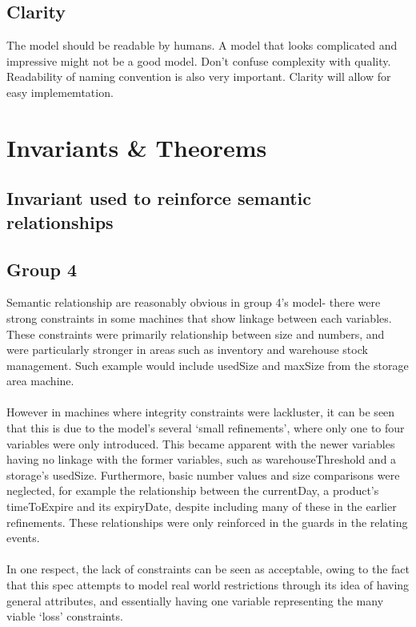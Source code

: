 \subsection{Clarity}
\label{clarity}

The model should be readable by humans. A model that looks complicated and impressive might not be a good model. Don't confuse complexity with quality. Readability of naming convention is also very important. Clarity will allow for easy implememtation.

\section{Invariants \& Theorems}
\label{invariantstheorems}

\subsection{Invariant used to reinforce semantic relationships}
\label{invariantusedtoreinforcesemanticrelationships}

\subsection{Group 4}
\label{group4}

Semantic relationship are reasonably obvious in group 4's model- there were strong constraints in some machines that show linkage between each variables. These constraints were primarily relationship between size and numbers, and were particularly stronger in areas such as inventory and warehouse stock management. Such example would include usedSize and maxSize from the storage area machine.
 \\ \\ However in machines where integrity constraints were lackluster, it can be seen that this is due to the model’s several ‘small refinements’, where only one to four variables were only introduced. This became apparent with the newer variables having no linkage with the former variables, such as warehouseThreshold and a storage’s usedSize. Furthermore, basic number values and size comparisons were neglected, for example the relationship between the currentDay, a product’s timeToExpire and its expiryDate, despite including many of these in the earlier refinements. These relationships were only reinforced in the guards in the relating events.
 \\ \\ In one respect, the lack of constraints can be seen as acceptable, owing to the fact that this spec attempts to model real world restrictions through its idea of having general attributes, and essentially having one variable representing the many viable ‘loss’ constraints. 

